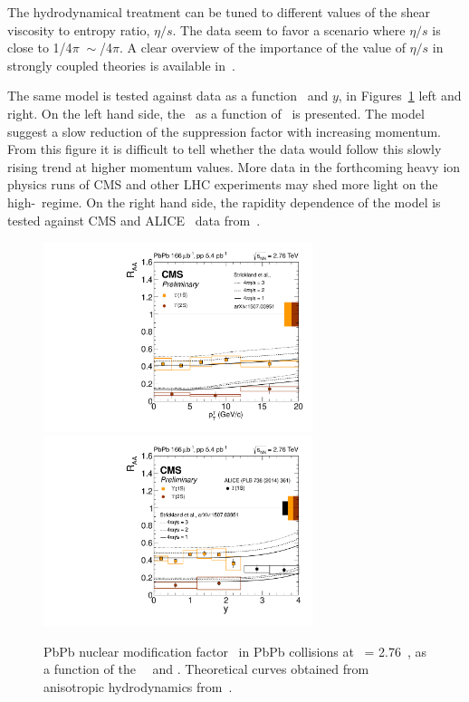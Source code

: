 The hydrodynamical treatment can be tuned to different values of the
shear viscosity to entropy ratio, $\eta/s$. The data seem to favor a
scenario where $\eta/s$ is close to 1/4$\pi\;\sim$/4$\pi$. A clear
overview of the importance of the value of $\eta/s$ in strongly
coupled theories is available in~\cite{Shuryak:2003xe}.


The same model is tested against data as a function \pt\ and $y$, in
Figures~\ref{fig:RAA_TH_kin_strickland} left and right. On the left
hand side, the \RAA\ as a function of \pt\ is presented. The model
suggest a slow reduction of the suppression factor with increasing
momentum. From this figure it is difficult to tell whether the data
would follow this slowly rising trend at higher momentum values. More
data in the forthcoming heavy ion physics runs of CMS and other LHC
experiments may shed more light on the high-\pt\ regime. On the right
hand side, the rapidity dependence of the model is tested against CMS
and ALICE \PgUa\ data from~\cite{ALICEUpsilonHI}.
\begin{figure}[h]
  \begin{centering}  
    \includegraphics[width=0.7\textwidth]{Chapters/aUpsilon/RAA_PT_Strickland.pdf}
    \includegraphics[width=0.7\textwidth]{Chapters/aUpsilon/RAA_RAP_Strickland_alice.pdf}
    \caption{PbPb nuclear modification factor \RAA\ in PbPb collisions
      at \snn\ = 2.76~\TeV, as a function of the \PgU\ \pt\ and \y. Theoretical curves obtained from anisotropic
      hydrodynamics from~\cite{Krouppa:2015yoa}.}
    \label{fig:RAA_TH_kin_strickland}
  \end{centering}  
\end{figure}

